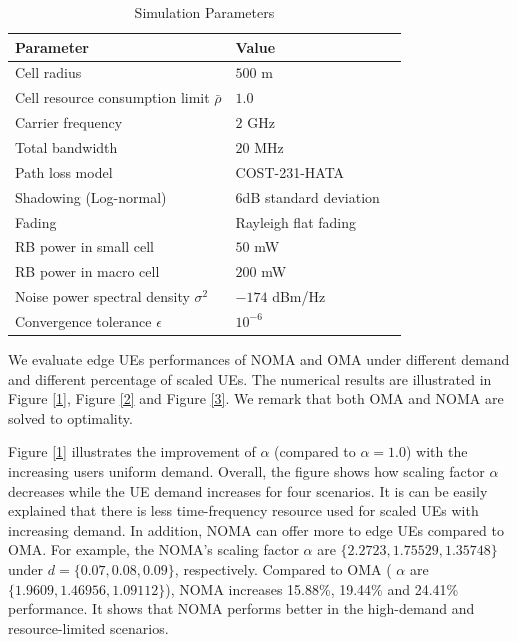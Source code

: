 \documentclass[10pt,journal,final,finalsubmission,twocolumn]{IEEEtran}
\begin{document}
\begin{table}[htbp]
 \caption{\label{tab:test}Simulation Parameters}
 \begin{center}
 \begin{tabular}{lll}
  \toprule
  \textbf{Parameter} & \textbf{Value}  \\
  \midrule
 Cell radius & $500$ m\\
 Cell resource consumption limit $\bar{\rho}$ & $1.0$  \\
 Carrier frequency & $2$ GHz\\
 Total bandwidth & $20$ MHz  \\
 Path loss model & COST-231-HATA\\
 Shadowing (Log-normal) &$6$dB standard deviation\\
 Fading &Rayleigh flat fading\\
 RB power in small cell & $50$ mW \\
 RB power in macro cell & $200$ mW \\
  Noise power spectral density $\sigma ^2$ & $-174$ dBm/Hz  \\
 Convergence tolerance $\epsilon$ & $10^{-6}$ \\

  \bottomrule
 \end{tabular}
  \end{center}
\end{table}

We evaluate edge UEs performances of NOMA and OMA under different demand and different percentage of scaled UEs. The numerical results are illustrated in Figure \ref{1}, Figure \ref{2} and Figure \ref{3}. We remark that both OMA and NOMA are solved to optimality.

Figure \ref{1} illustrates the improvement of $\alpha $ (compared to $\alpha = 1.0$) with the increasing users uniform demand. Overall, the figure shows how scaling factor $\alpha$ decreases while the UE demand increases for four scenarios. It is can be easily explained that there is less time-frequency resource used for scaled UEs with increasing demand. In addition, NOMA can offer more to edge UEs compared to OMA. For example, the NOMA's scaling factor $\alpha$ are $\{2.2723, 1.75529, 1.35748\}$ under $d=\{0.07, 0.08, 0.09\}$, respectively. Compared to OMA ( $\alpha$ are $\{1.9609, 1.46956, 1.09112\}$), NOMA increases 15.88\%, 19.44\% and 24.41\% performance. It shows that NOMA performs better in the high-demand and resource-limited scenarios. 
\end{document}
